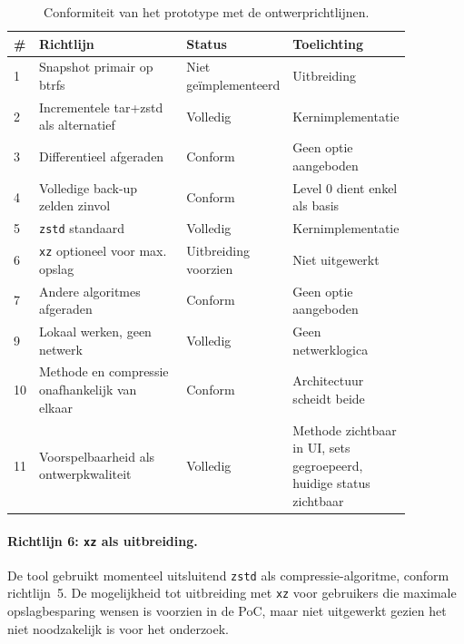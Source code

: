 \begin{table}[h]
    \centering
    \small
    \begin{tabular}{p{0.04\linewidth}p{0.40\linewidth}p{0.18\linewidth}p{0.25\linewidth}}
        \toprule
        \textbf{\#} & \textbf{Richtlijn} & \textbf{Status} & \textbf{Toelichting} \\
        \midrule
        1 & Snapshot primair op btrfs              & Niet geïmplementeerd & Uitbreiding \\
        2 & Incrementele tar+zstd als alternatief  & Volledig             & Kernimplementatie \\
        3 & Differentieel afgeraden                & Conform              & Geen optie aangeboden \\
        4 & Volledige back-up zelden zinvol        & Conform              & Level 0 dient enkel als basis \\
        5 & \texttt{zstd} standaard                & Volledig             & Kernimplementatie \\
        6 & \texttt{xz} optioneel voor max. opslag & Uitbreiding voorzien & Niet uitgewerkt \\
        7 & Andere algoritmes afgeraden            & Conform              & Geen optie aangeboden \\
        9 & Lokaal werken, geen netwerk            & Volledig             & Geen netwerklogica \\
        10 & Methode en compressie onafhankelijk van elkaar     & Conform              & Architectuur scheidt beide \\
        11 & Voorspelbaarheid als ontwerpkwaliteit & Volledig             & Methode zichtbaar in UI, sets gegroepeerd, huidige status zichtbaar \\
        \bottomrule
    \end{tabular}
    \caption{Conformiteit van het prototype met de ontwerprichtlijnen.}
    \label{tab:eval-conformiteit}
\end{table}

\paragraph{Richtlijn 6: \texttt{xz} als uitbreiding.}
De tool gebruikt momenteel uitsluitend \texttt{zstd} als compressie-algoritme, conform richtlijn~5. De mogelijkheid tot uitbreiding met \texttt{xz} voor gebruikers die maximale opslagbesparing wensen is voorzien in de PoC, maar niet uitgewerkt gezien het niet noodzakelijk is voor het onderzoek.


